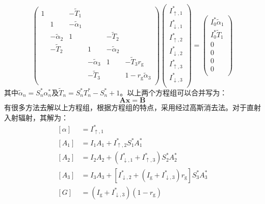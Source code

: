 \begin{equation}
  \left(\begin{matrix}1&&-{\widetilde{T}}_1&&&\\&1&-{\widetilde{\alpha}}_1&&&\\&-{\widetilde{\alpha}}_2&1&&-{\widetilde{T}}_2&\\&-{\widetilde{T}}_2&&1&-{\widetilde{\alpha}}_2&\\&&&-{\widetilde{\alpha}}_3&1&-{\widetilde{T}}_3r_{\mathrm {g}}\\&&&-{\widetilde{T}}_3&&1-r_{\mathrm {g}}{\widetilde{\alpha}}_3\\\end{matrix}\right)\left(\begin{matrix}I_{\uparrow,1}^\ast\\I_{\downarrow,1}^\ast\\I_{\uparrow,2}^\ast\\I_{\downarrow,2}^\ast\\I_{\uparrow,3}^\ast\\I_{\downarrow,3}^\ast\\\end{matrix}\right)=\left(\begin{matrix}I_0^\ast{\widetilde{\alpha}}_1\\I_0^\ast{\widetilde{T}}_1\\0\\0\\0\\0\\\end{matrix}\right)
\end{equation}
其中${\widetilde{\alpha}}_n=S_n^\ast\alpha_n^\ast$及${\widetilde{T}}_n=S_n^\ast T_n^\ast-S_n^\ast+1$。以上两个方程组可以合并写为：
\begin{equation}
  \mathbf{A x}=\mathbf{B}
\end{equation}
有很多方法去解以上方程组，根据方程组的特点，采用经过高斯消去法。对于直射入射辐射，其解为：
\begin{equation}
  \begin{aligned}
    \left [\alpha \right ] &=I_{\uparrow, 1}^{*} \\[1ex] \left[A_{1}\right] &=I_{1} A_{1}+I_{\uparrow, 2}^{*} S_{1}^{*} A_{1}^{*} \\[1ex]
    \left[A_{2}\right] &=I_{2} A_{2}+\left(I_{\downarrow, 1}^{*}+I_{\uparrow, 3}^{*}\right) S_{2}^{*} A_{2}^{*} \\[1ex]
    \left[A_{3}\right] &=I_{3} A_{3}+\left[I_{\downarrow, 2}^{*}+\left(I_{\mathrm g}+I_{\downarrow, 3}^{*}\right) r_{\mathrm{g}}\right] S_{3}^{*} A_{3}^{*} \\[1ex]
    [G] &=\left(I_{\mathrm{g}}+I_{\downarrow, 3}^{*}\right)\left(1-r_{\mathrm{g}}\right)
  \end{aligned}
\end{equation}
